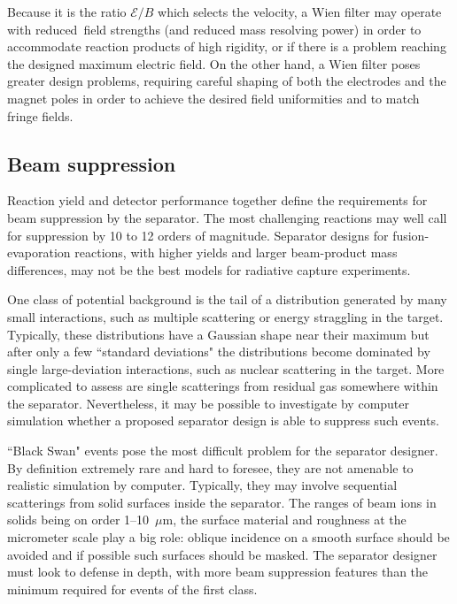 Because it is  the ratio $\mathcal{E}/B$ which selects the velocity, a Wien filter may operate with reduced\ field strengths (and reduced mass resolving power)  in order to accommodate reaction products of high rigidity, or if there is a problem reaching the designed maximum electric field.    On the other hand, a Wien filter poses greater design problems, requiring careful shaping of both the electrodes and the magnet poles in order to achieve the desired field uniformities and to match fringe fields.

\subsection{Beam suppression }
Reaction yield and detector performance together define the requirements for beam suppression by the separator.    The most challenging reactions  may well call for suppression by 10 to 12 orders of magnitude.    Separator designs for fusion-evaporation reactions, with higher yields and larger beam-product mass differences, may not be the best models  for radiative capture experiments.   
    
 One class of potential background is the tail of a  distribution generated by many small interactions, such as multiple scattering or energy straggling in the target.    Typically, these distributions have a Gaussian shape near their maximum but after only a few  ``standard deviations" the distributions become dominated by single large-deviation interactions, such as nuclear scattering in the target.    More complicated to assess are single scatterings from residual gas somewhere within the separator.   Nevertheless, it may be possible to investigate by computer simulation whether  a proposed separator design is able to suppress such events.
 
  ``Black Swan" events pose the most difficult problem for the separator designer.   By definition extremely rare and hard to foresee,  they are not  amenable to realistic simulation by computer.   Typically, they may involve sequential scatterings from  solid surfaces inside the separator.   The ranges of beam ions in solids being on order 1--10~$\mu$m, the surface material and roughness at the micrometer scale play a big role: oblique incidence on a smooth surface should be avoided and if possible such surfaces should be masked.   The separator designer must look to defense in depth, with more beam suppression features than the minimum required for events of the first  class.

